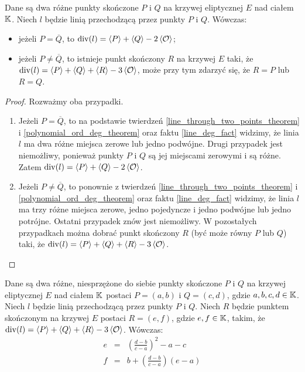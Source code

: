 \begin{theorem}
Dane są dwa różne punkty skończone $P$ i $Q$
na krzywej eliptycznej $E$ nad ciałem $\mathbb{K}$.
Niech $l$ będzie linią przechodzącą przez punkty $P$ i $Q$.
Wówczas:
\begin{itemize}
\item jeżeli $P = \overline{Q}$,
to $\operatorname{div}(l) = \left\langle P\right\rangle + \left\langle Q\right\rangle - 2\left\langle\mathcal{O}\right\rangle$;
\item jeżeli $P \neq \overline{Q}$,
to istnieje punkt skończony $R$ na krzywej $E$ taki,
że $\operatorname{div}(l) = \left\langle P\right\rangle + \left\langle Q\right\rangle + \left\langle R\right\rangle - 3\left\langle\mathcal{O}\right\rangle$,
może przy tym zdarzyć się, że $R = P$ lub $R = Q$.
\end{itemize}
\end{theorem}

\begin{proof}
Rozważmy oba przypadki.
\begin{enumerate}
\item
Jeżeli $P = \overline{Q}$,
to na podstawie twierdzeń
\ref{line_through_two_points_theorem} i \ref{polynomial_ord_deg_theorem}
oraz faktu \ref{line_deg_fact} widzimy,
że linia $l$ ma dwa różne miejsca zerowe lub jedno podwójne.
Drugi przypadek jest niemożliwy,
ponieważ punkty $P$ i $Q$ są jej miejscami zerowymi i są różne.
Zatem $\operatorname{div}(l) = \left\langle P\right\rangle + \left\langle Q\right\rangle - 2\left\langle\mathcal{O}\right\rangle$.
\item
Jeżeli $P \neq \overline{Q}$,
to ponownie z twierdzeń
\ref{line_through_two_points_theorem} i \ref{polynomial_ord_deg_theorem}
oraz faktu \ref{line_deg_fact} widzimy,
że linia $l$ ma trzy różne miejsca zerowe, jedno pojedyncze i jedno podwójne
lub jedno potrójne.
Ostatni przypadek znów jest niemożliwy.
W pozostałych przypadkach można dobrać punkt skończony $R$
(być może równy $P$ lub $Q$) taki,
że $\operatorname{div}(l) = \left\langle P\right\rangle + \left\langle Q\right\rangle + \left\langle R\right\rangle - 3\left\langle\mathcal{O}\right\rangle$.
\end{enumerate}
\end{proof}

\begin{theorem}
Dane są dwa różne, niesprzężone do siebie
punkty skończone $P$ i $Q$ na krzywej eliptycznej $E$ nad ciałem $\mathbb{K}$
postaci $P = (a, b)$ i $Q = (c, d)$, gdzie $a, b, c, d \in \mathbb{K}$.
Niech $l$ będzie linią przechodzącą przez punkty $P$ i $Q$.
Niech $R$ będzie punktem skończonym na krzywej $E$
postaci $R = (e, f)$, gdzie $e, f \in \mathbb{K}$, takim,
że $\operatorname{div}(l) = \left\langle P\right\rangle + \left\langle Q\right\rangle + \left\langle R\right\rangle - 3\left\langle\mathcal{O}\right\rangle$.
Wówczas:
\begin{eqnarray}
\label{chord_line_third_point_x_eqn}
e & = & \left(\frac{d-b}{c-a}\right)^2 - a - c \\
\label{chord_line_third_point_y_eqn}
f & = & b + \left(\frac{d-b}{c-a}\right)(e-a)
\end{eqnarray}
\end{theorem}

